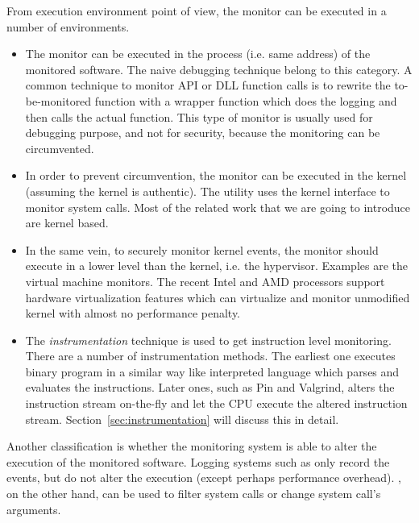  From execution environment point of view, the monitor can be executed
in a number of environments.
\begin{itemize}
\item The monitor can be executed in the process (i.e. same address)
of the monitored software.
The naive  debugging technique belong to this category.
A common technique to monitor API or DLL function calls is to rewrite
the to-be-monitored function with a wrapper function which does the
logging and then calls the actual function.
This type of monitor is usually used for debugging purpose, and not for
security, because the monitoring can be circumvented.
\item In order to prevent circumvention,
the monitor can be executed in the kernel (assuming the kernel is authentic).
The  utility uses the kernel  interface
to monitor system calls.
Most of the related work that we are going to introduce are kernel based.
\item In the same vein, to securely monitor kernel events, the monitor
should execute in a lower level than the kernel, i.e. the hypervisor.
Examples are the virtual machine monitors.
The recent Intel and AMD processors support hardware virtualization
features which can virtualize and monitor unmodified kernel with almost
no performance penalty.
\item The {\em instrumentation} technique is used to get instruction
level monitoring.
There are a number of instrumentation methods.
The earliest one executes binary program in a similar way
like interpreted language which parses and evaluates the instructions.
Later ones, such as Pin and Valgrind, alters the instruction stream on-the-fly
and let the CPU execute the altered instruction stream.
Section~\ref{sec:instrumentation} will discuss this in detail.
\end{itemize}

Another classification is whether the monitoring system is able to
alter the execution of the monitored software.
Logging systems such as  only record the events,
but do not alter the execution (except perhaps performance overhead).
, on the other hand, can be used to filter system calls
or change system call's arguments.

